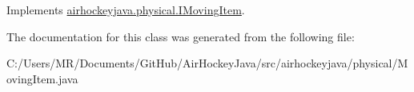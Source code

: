 Implements \hyperlink{interfaceairhockeyjava_1_1physical_1_1_i_moving_item_a6b73630eb20d349944040ff07338e8c1}{airhockeyjava.\+physical.\+I\+Moving\+Item}.



The documentation for this class was generated from the following file\+:\begin{DoxyCompactItemize}
\item 
C\+:/\+Users/\+M\+R/\+Documents/\+Git\+Hub/\+Air\+Hockey\+Java/src/airhockeyjava/physical/Moving\+Item.\+java\end{DoxyCompactItemize}
